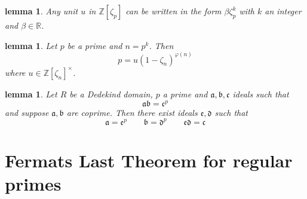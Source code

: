 \documentclass[11pt,a4paper]{amsart}
\theoremstyle{plain}
\newtheorem{lemma}[subsection]{lemma}
\theoremstyle{definition}
\theoremstyle{definition}
\newcommand{\ZZ}{\mathbb{Z}}
\newcommand{\RR}{\mathbb{R}}
\def\gothb{\mathfrak{b}}
\def\gothc{\mathfrak{c}}
\def\gotha{\mathfrak{a}}
\begin{document}
	
	\begin{lemma}\label{lemma: unit lemma}
		Any unit $u$ in $\ZZ[\zeta_p]$ can be written in the form $\beta \zeta_p^k  $ with $k$ an integer and $\beta \in \RR$.
	\end{lemma}	
	
	\begin{lemma}\label{lemma: fac of p in p_th root}
		Let $p$ be a prime and $n=p^k$. Then \[p=u(1-\zeta_n)^{\varphi(n)}\] where $u \in \ZZ[\zeta_n]^{\times}$.
	\end{lemma}
	
	\begin{lemma}\label{lemma: ideals mult to power}
		Let $R$ be a Dedekind domain, $p$ a prime and $\gotha,\gothb,\gothc$ ideals such that \[\gotha\gothb=\gothc^p\] and suppose $\gotha,\gothb$ are coprime. Then there exist ideals $\mathfrak{e},\mathfrak{d}$ such that \[\gotha=\mathfrak{e}^p \qquad \gothb=\mathfrak{d}^p \qquad \mathfrak{e}\mathfrak{d}=\gothc\] 
	\end{lemma}
	
	
	\section{Fermats Last Theorem for regular primes}
	
\end{document}
